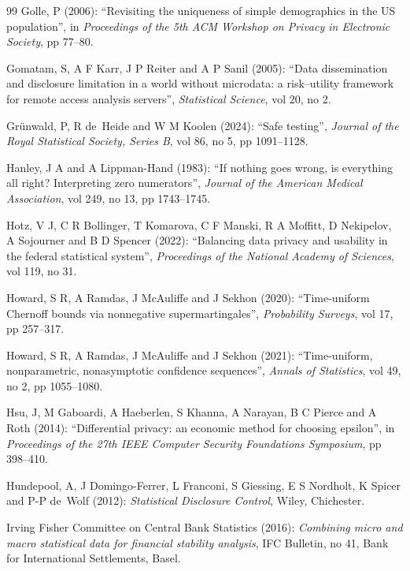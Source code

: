 \documentclass[11pt,a4paper]{article}
\theoremstyle{plain}
\theoremstyle{definition}
\theoremstyle{definition}
\theoremstyle{plain}
\begin{document}
\begin{thebibliography}{99}
Golle, P (2006): ``Revisiting the uniqueness of simple demographics in the US population'', in \emph{Proceedings of the 5th ACM Workshop on Privacy in Electronic Society}, pp 77--80.

Gomatam, S, A F Karr, J P Reiter and A P Sanil (2005): ``Data dissemination and disclosure limitation in a world without microdata: a risk--utility framework for remote access analysis servers'', \emph{Statistical Science}, vol 20, no 2.

Gr\"unwald, P, R de~Heide and W M Koolen (2024): ``Safe testing'', \emph{Journal of the Royal Statistical Society, Series B}, vol 86, no 5, pp 1091--1128.

Hanley, J A and A Lippman-Hand (1983): ``If nothing goes wrong, is everything all right? Interpreting zero numerators'', \emph{Journal of the American Medical Association}, vol 249, no 13, pp 1743--1745.

Hotz, V J, C R Bollinger, T Komarova, C F Manski, R A Moffitt, D Nekipelov, A Sojourner and B D Spencer (2022): ``Balancing data privacy and usability in the federal statistical system'', \emph{Proceedings of the National Academy of Sciences}, vol 119, no 31.

Howard, S R, A Ramdas, J McAuliffe and J Sekhon (2020): ``Time-uniform Chernoff bounds via nonnegative supermartingales'', \emph{Probability Surveys}, vol 17, pp 257--317.

Howard, S R, A Ramdas, J McAuliffe and J Sekhon (2021): ``Time-uniform, nonparametric, nonasymptotic confidence sequences'', \emph{Annals of Statistics}, vol 49, no 2, pp 1055--1080.

Hsu, J, M Gaboardi, A Haeberlen, S Khanna, A Narayan, B C Pierce and A Roth (2014): ``Differential privacy: an economic method for choosing epsilon'', in \emph{Proceedings of the 27th IEEE Computer Security Foundations Symposium}, pp 398--410.

Hundepool, A, J Domingo-Ferrer, L Franconi, S Giessing, E S Nordholt, K Spicer and P-P de~Wolf (2012): \emph{Statistical Disclosure Control}, Wiley, Chichester.

Irving Fisher Committee on Central Bank Statistics (2016): \emph{Combining micro and macro statistical data for financial stability analysis}, IFC Bulletin, no 41, Bank for International Settlements, Basel.


\end{thebibliography}
\end{document}
